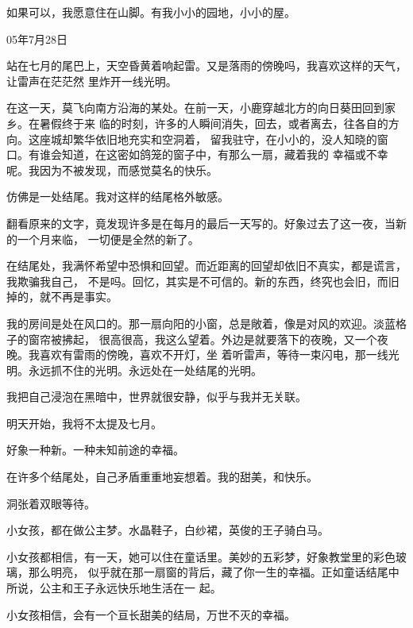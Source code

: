 		如果可以，我愿意住在山脚。有我小小的园地，小小的屋。

		\begin{flushright}
			05年7月28日
		\end{flushright}

	\endwriting



		站在七月的尾巴上，天空昏黄着响起雷。又是落雨的傍晚吗，我喜欢这样的天气，让雷声在茫茫然
	里炸开一线光明。

		在这一天，莫飞向南方沿海的某处。在前一天，小鹿穿越北方的向日葵田回到家乡。在暑假终于来
	临的时刻，许多的人瞬间消失，回去，或者离去，往各自的方向。这座城却繁华依旧地充实和空洞着，
	留我驻守，在小小的，没人知晓的窗口。有谁会知道，在这密如鸽笼的窗子中，有那么一扇，藏着我的
	幸福或不幸呢。我因为不被发现，而感觉莫名的快乐。

		仿佛是一处结尾。我对这样的结尾格外敏感。

		翻看原来的文字，竟发现许多是在每月的最后一天写的。好象过去了这一夜，当新的一个月来临，
	一切便是全然的新了。

		在结尾处，我满怀希望中恐惧和回望。而近距离的回望却依旧不真实，都是谎言，我欺骗我自己，
	不是吗。回忆，其实是不可信的。新的东西，终究也会旧，而旧掉的，就不再是事实。

		我的房间是处在风口的。那一扇向阳的小窗，总是敞着，像是对风的欢迎。淡蓝格子的窗帘被拂起，
	很高很高，我这么望着。外边是就要落下的夜晚，又一个夜晚。我喜欢有雷雨的傍晚，喜欢不开灯，坐
	着听雷声，等待一束闪电，那一线光明。永远抓不住的光明。永远处在一处结尾的光明。

		我把自己浸泡在黑暗中，世界就很安静，似乎与我并无关联。\par
		明天开始，我将不太提及七月。\par
		好象一种新。一种未知前途的幸福。\par
		在许多个结尾处，自己矛盾重重地妄想着。我的甜美，和快乐。\par
		洞张着双眼等待。

	\endwriting



		小女孩，都在做公主梦。水晶鞋子，白纱裙，英俊的王子骑白马。

		小女孩都相信，有一天，她可以住在童话里。美妙的五彩梦，好象教堂里的彩色玻璃，那么明亮，
	似乎就在那一扇窗的背后，藏了你一生的幸福。正如童话结尾中所说，公主和王子永远快乐地生活在一
	起。

		小女孩相信，会有一个亘长甜美的结局，万世不灭的幸福。

